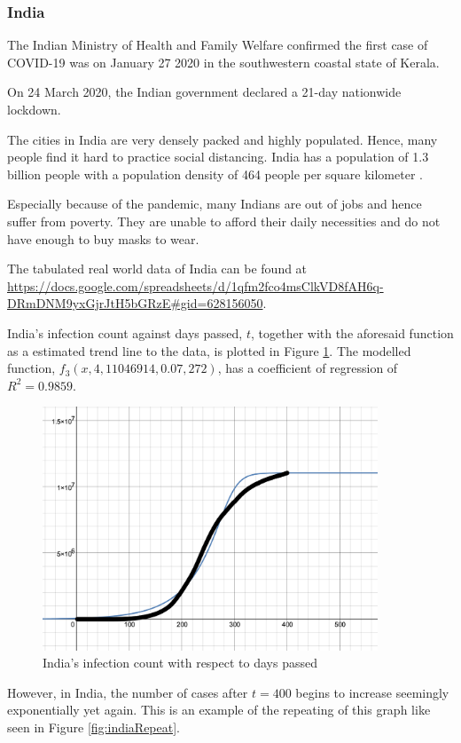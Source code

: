 \documentclass[a4paper,titlepage]{article}
\begin{document}
\subsubsection{India}

The Indian Ministry of Health and Family Welfare confirmed the first case of COVID-19 was on January 27 2020 in the southwestern coastal state of Kerala. 

On 24 March 2020, the Indian government declared a 21-day nationwide lockdown.

The cities in India are very densely packed and highly populated. Hence, many people find it hard to practice social distancing. India has a population of 1.3 billion people with a population density of 464 people per square kilometer \cite{indiadistance_pandey_2020}.

Especially because of the pandemic, many Indians are out of jobs and hence suffer from poverty. They are unable to afford their daily necessities and do not have enough to buy masks to wear.

The tabulated real world data of India can be found at \url{https://docs.google.com/spreadsheets/d/1qfm2fco4msClkVD8fAH6q-DRmDNM9yxGjrJtH5bGRzE#gid=628156050}.

India's infection count against days passed, $t$, together with the aforesaid function as a estimated trend line to the data, is plotted in Figure \ref{fig:rwG2}. The modelled function, $f_3(x,4,11046914,0.07,272)$, has a coefficient of regression of $R^2=0.9859$.

\begin{figure}[htbp]
    \centering
    \includegraphics[width=10cm]{rwG2.png}
    \caption{India's infection count with respect to days passed}
    \label{fig:rwG2}
\end{figure}

However, in India, the number of cases after $t=400$ begins to increase seemingly exponentially yet again. This is an example of the repeating of this graph like seen in Figure \ref{fig:indiaRepeat}.
\end{document}
